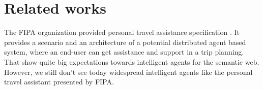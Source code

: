 \documentclass{llncs}
\begin{document}

\section{Related works}


The \gls{FIPA} organization provided personal travel assistance specification \cite{fipa000132000fipa}. It provides a scenario and an architecture of a potential distributed agent based system, where an end-user can get assistance and support in a trip planning. That show quite big expectations towards intelligent agents for the semantic web. However, we still don't see today widespread intelligent agents like the personal travel assistant presented by \gls{FIPA}.
\end{document}
